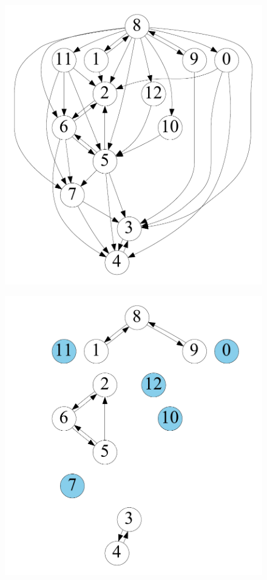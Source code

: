 \begin{figure}[t]
	\centering
	\begin{minipage}[b]{0.19\linewidth}
		\captionsetup{type=figure}
		\centering
		{\includegraphics[width=\textwidth]{./alg_fig/scc-g0}}
	\end{minipage}
	\begin{minipage}[b]{0.19\linewidth}
		\centering
		{\includegraphics[width=\textwidth]{./alg_fig/scc-g1}}

\end{minipage}
\end{figure}
